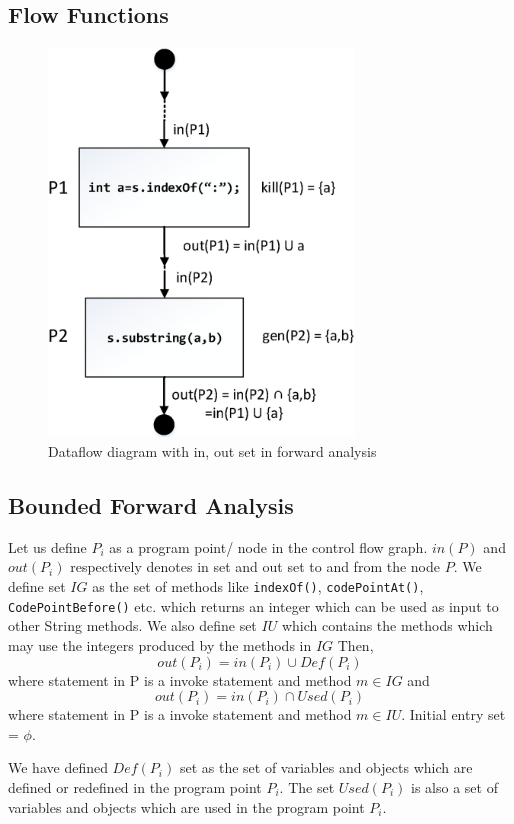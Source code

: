 \subsection{Flow Functions}
\label{subsec:flowFunctions}

\begin{figure}[htb]
\centering
\includegraphics[width=3.2in]{images/dataflow.png}
\caption{Dataflow diagram with in, out set in forward analysis}
\label{fig:dataflow}
\end{figure}

\subsection{Bounded Forward Analysis}
\label{subsec:boundedForward}

Let us define $P_i$ as a program point/ node in the control flow graph. $in(P)$
and $out(P_i)$ respectively denotes in set and out set to and from the node $P$.
We define set $IG$ as the set of methods like \texttt{indexOf()},
\texttt{codePointAt()}, \texttt{CodePointBefore()} etc. which returns an integer
which can be used as input to other String methods. We also define set $IU$
which contains the methods which may use the integers produced by the methods in
$IG$ Then, 
$$out(P_i) = in(P_i) \cup Def(P_i)$$ where statement in P is a invoke statement
and method $m \in IG$ and
$$out(P_i) = in(P_i) \cap Used(P_i)$$ where statement in P is a invoke statement
and method $m \in IU$. Initial entry set = ${\phi}$.


We have defined $Def(P_i)$ set as the set of variables and objects which are
defined or redefined in the program point $P_i$. The set $Used(P_i)$ is also a
set of variables and objects which are used in the program point $P_i$.

